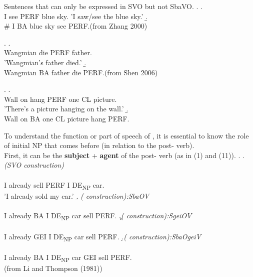 \documentclass[12pt, oneside]{article}
\begin{document}
Sentences that can only be expressed in SVO but not SbaVO. 
\ex. \a. \\
I see PERF blue sky.
'I saw/see the blue sky.'
\b. \\
\# I BA blue sky see PERF.(from Zhang 2000) 

\ex. \a. \\
Wangmian die PERF father.\\
'Wangmian's father died.'
\b. \\
\text{*}Wangmian BA father die PERF.(from Shen 2006)

\ex. \a. \\
Wall on hang PERF one CL picture.\\
'There's a picture hanging on the wall.'
\b. \\
\text{*}Wall on BA one CL picture hang PERF.




To understand the function or part of speech of , it is essential to know the role of initial NP that comes before  (in relation to the post- verb).\\
First, it can be the \textbf{subject} + \textbf{agent} of the post- verb (as in (1) and (11)).
\ex. \a. \textit{(SVO construction)}\\\\
I already sell PERF I DE\textsubscript{NP} car.\\
'I already sold my car.'
\b. \textit{( construction):SbaOV}\\
\\
I already BA I DE\textsubscript{NP} car sell PERF.
\c.\textit{( construction):SgeiOV}\\ \\
I already GEI I DE\textsubscript{NP} car sell PERF.
\d.\textit{( construction):SbaOgeiV}\\ \\
I already BA I DE\textsubscript{NP} car GEI sell PERF.
\\(from Li and Thompson (1981))
\end{document}
